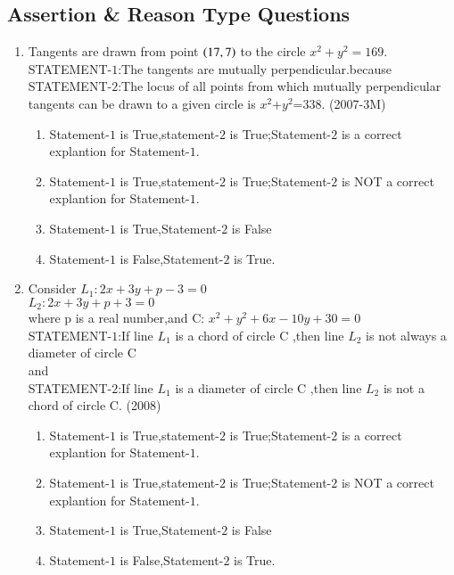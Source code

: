 \documentclass[journal,12pt,twocolumn]{IEEEtran}
\theoremstyle{remark}
\begin{document}
\subsection{Assertion \& Reason Type Questions}
\begin{enumerate}
\item Tangents are drawn from point $\left(17 , 7\right)$ to the circle $x^2+y^2=169$.\\
STATEMENT-$1$:The tangents are mutually perpendicular.because\\
STATEMENT-$2$:The locus of all points from which mutually perpendicular tangents can be drawn to a given circle is $x^2$+$y^2$=$338.$ \hfill{(2007-3M)}\\
\begin{enumerate}
\item Statement-$1$ is True,statement-$2$ is True;Statement-$2$ is a correct explantion for Statement-$1$.\\
\item Statement-$1$ is True,statement-$2$ is True;Statement-$2$ is NOT a correct explantion for Statement-$1$.\\
\item Statement-$1$ is True,Statement-$2$ is False\\
\item Statement-$1$ is False,Statement-$2$ is True.\\
\end{enumerate}

\item Consider $L_1:2x+3y+p-3=0$\\
               $L_2:2x+3y+p+3=0$\\
where p is a real number,and C: $x^2+y^2+6x-10y+30=0$\\
STATEMENT-$1$:If line $L_1$ is a chord of circle C ,then line $L_2$ is not always a diameter of circle C\\
and\\
STATEMENT-$2$:If line $L_1$ is a diameter of circle C ,then line $L_2$ is not a chord  of circle C. \hfill{(2008)}\\
\begin{enumerate}
\item Statement-$1$ is True,statement-$2$ is True;Statement-$2$ is a correct explantion for Statement-$1$.\\
\item Statement-$1$ is True,statement-$2$ is True;Statement-$2$ is NOT a correct explantion for Statement-$1$.\\
\item Statement-$1$ is True,Statement-$2$ is False\\
\item Statement-$1$ is False,Statement-$2$ is True.\\		
\end{enumerate}
\end{enumerate}
\end{document}
